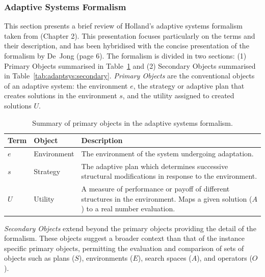 %
%
\subsubsection{Adaptive Systems Formalism}
\label{subsubsec:cs:adaptive:formalism}
This section presents a brief review of Holland's adaptive systems formalism taken from \cite{Holland1992} (Chapter 2). This presentation focuses particularly on the terms and their description, and has been hybridised with the concise presentation of the formalism by De~Jong \cite{Jong1975} (page 6). The formalism is divided in two sections: (1) Primary Objects summarised in Table~\ref{tab:adaptsys:primary} and (2) Secondary Objects summarised in Table~\ref{tab:adaptsys:secondary}. \emph{Primary Objects} are the conventional objects of an adaptive system: the environment $e$, the strategy or adaptive plan that creates solutions in the environment $s$, and the utility assigned to created solutions $U$.

\begin{table}[ht]
	\centering\small
		\begin{tabularx}{\textwidth}{llX}
		\toprule
		\textbf{Term} & \textbf{Object} & \textbf{Description} \\ 
		\toprule
		$e$ & Environment & The environment of the system undergoing adaptation. \\ 
		\midrule
		$s$ & Strategy & The adaptive plan which determines successive structural modifications in response to the environment. \\ 
		\midrule
		$U$ & Utility & A measure of performance or payoff of different structures in the environment. Maps a given solution ($A$) to a real number evaluation. \\ 
		\bottomrule
		\end{tabularx}	
	\caption{Summary of primary objects in the adaptive systems formalism.}
	\label{tab:adaptsys:primary}
\end{table}

\emph{Secondary Objects} extend beyond the primary objects providing the detail of the formalism. These objects suggest a broader context than that of the instance specific primary objects, permitting the evaluation and comparison of sets of objects such as plans ($S$), environments ($E$), search spaces ($A$), and operators ($O$).


